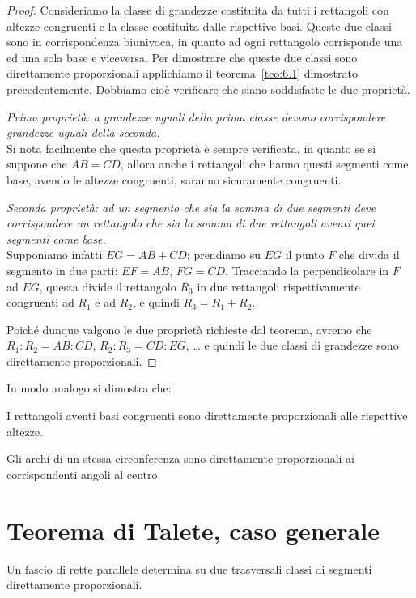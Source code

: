 \begin{proof}
Consideriamo la classe di grandezze costituita da tutti i rettangoli con altezze congruenti e la classe costituita dalle rispettive basi. Queste due classi sono in corrispondenza biunivoca, in quanto ad ogni rettangolo corrisponde una ed una sola base e viceversa.
Per dimostrare che queste due classi sono direttamente proporzionali applichiamo il teorema~\ref{teo:6.1} dimostrato precedentemente. Dobbiamo cioè verificare che siano soddisfatte le due proprietà.

\emph{Prima proprietà: a grandezze uguali della prima classe devono corrispondere grandezze uguali della seconda.}\\
Si nota facilmente che questa proprietà è sempre verificata, in quanto se si suppone che $AB = CD$, allora anche i rettangoli che hanno questi segmenti come base, avendo le altezze congruenti, saranno sicuramente congruenti.

\emph{Seconda proprietà: ad un segmento che sia la somma di due segmenti deve corrispondere un rettangolo che sia la somma di due rettangoli aventi quei segmenti come base.}\\
Supponiamo infatti $EG =  AB + CD$; prendiamo su $EG$ il punto $F$ che divida il segmento in due parti: $EF=AB$, $FG=CD$. Tracciando la perpendicolare in $F$ ad $EG$, questa divide il rettangolo $R_3$ in due rettangoli rispettivamente congruenti ad $R_1$ e ad $R_2$, e quindi $R_3= R_1+R_2$.

Poiché dunque valgono le due proprietà richieste dal teorema, avremo che $R_1 : R_2 = AB : CD$, 
$R_2 : R_3 = CD  : EG$, \ldots{} e quindi le due classi di grandezze sono direttamente proporzionali.
\end{proof}

In modo analogo si dimostra che:
\begin{itemize*}
\item I rettangoli aventi basi congruenti sono direttamente proporzionali alle rispettive altezze.
\item Gli archi di un stessa circonferenza sono direttamente proporzionali ai corrispondenti angoli al centro.
\end{itemize*}


\section{Teorema di Talete, caso generale}

\begin{teorema}[di Talete]
Un fascio di rette parallele determina su due trasversali classi di segmenti direttamente proporzionali.
\end{teorema}

